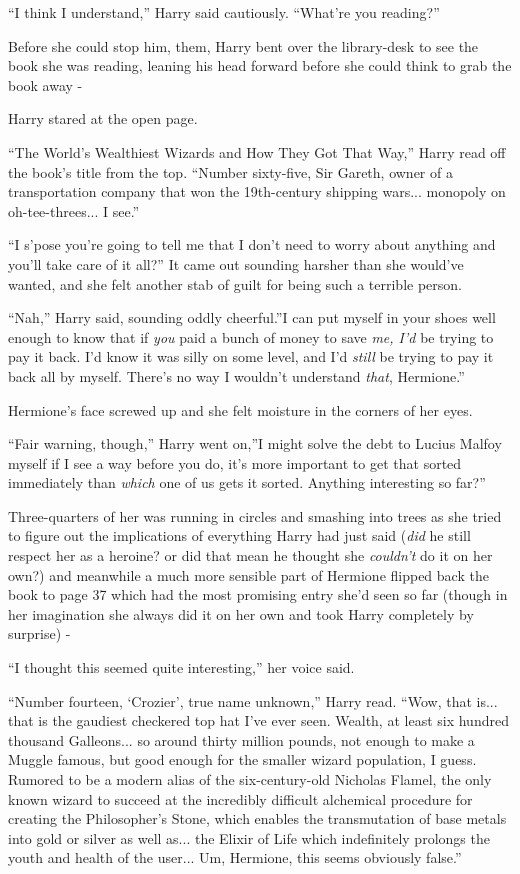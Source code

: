 ``I think I understand,'' Harry said cautiously. ``What're you
reading?''

Before she could stop him, them, Harry bent over the library-desk to see
the book she was reading, leaning his head forward before she could
think to grab the book away -

Harry stared at the open page.

``The World's Wealthiest Wizards and How They Got That Way,'' Harry read
off the book's title from the top. ``Number sixty-five, Sir Gareth,
owner of a transportation company that won the 19th-century shipping
wars... monopoly on oh-tee-threes... I see.''

``I s'pose you're going to tell me that I don't need to worry about
anything and you'll take care of it all?'' It came out sounding harsher
than she would've wanted, and she felt another stab of guilt for being
such a terrible person.

``Nah,'' Harry said, sounding oddly cheerful.''I can put myself in your
shoes well enough to know that if \emph{you} paid a bunch of money to
save \emph{me, I'd} be trying to pay it back. I'd know it was silly on
some level, and I'd \emph{still} be trying to pay it back all by myself.
There's no way I wouldn't understand \emph{that}, Hermione.''

Hermione's face screwed up and she felt moisture in the corners of her
eyes.

``Fair warning, though,'' Harry went on,''I might solve the debt to
Lucius Malfoy myself if I see a way before you do, it's more important
to get that sorted immediately than \emph{which} one of us gets it
sorted. Anything interesting so far?''

Three-quarters of her was running in circles and smashing into trees as
she tried to figure out the implications of everything Harry had just
said (\emph{did} he still respect her as a heroine? or did that mean he
thought she \emph{couldn't} do it on her own?) and meanwhile a much more
sensible part of Hermione flipped back the book to page 37 which had the
most promising entry she'd seen so far (though in her imagination she
always did it on her own and took Harry completely by surprise) -

``I thought this seemed quite interesting,'' her voice said.

``Number fourteen, `Crozier', true name unknown,'' Harry read. ``Wow,
that is... that is the gaudiest checkered top hat I've ever seen.
Wealth, at least six hundred thousand Galleons... so around thirty
million pounds, not enough to make a Muggle famous, but good enough for
the smaller wizard population, I guess. Rumored to be a modern alias of
the six-century-old Nicholas Flamel, the only known wizard to succeed at
the incredibly difficult alchemical procedure for creating the
Philosopher's Stone, which enables the transmutation of base metals into
gold or silver as well as... the Elixir of Life which indefinitely
prolongs the youth and health of the user... Um, Hermione, this
seems obviously false.''

